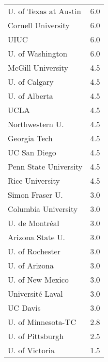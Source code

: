 \documentclass[aspectratio=169]{beamer}
\begin{document}
\begin{frame}[fragile]
\begin{columns}[T]
\begin{column}{0.5\textwidth}
\begin{tabularx}{\linewidth}{lS[table-format=1.1]}
                \midrule
                U. of Texas at Austin & 6.0 \\
                Cornell University & 6.0 \\
                UIUC & 6.0 \\
                U. of Washington & 6.0 \\
                McGill University & 4.5 \\
                U. of Calgary & 4.5 \\
                U. of Alberta & 4.5 \\
                UCLA & 4.5 \\
                Northwestern U. & 4.5 \\
                Georgia Tech & 4.5 \\
                UC San Diego & 4.5 \\
                Penn State University & 4.5 \\
                Rice University & 4.5 \\
                Simon Fraser U. & 3.0 \\
                Columbia University & 3.0 \\
                U. de Montréal & 3.0 \\
                Arizona State U. & 3.0 \\
                U. of Rochester & 3.0 \\
                U. of Arizona & 3.0 \\
                U. of New Mexico & 3.0 \\
                Université Laval & 3.0 \\
                UC Davis & 3.0 \\
                U. of Minnesota-TC & 2.8 \\
                U. of Pittsburgh & 2.5 \\
                U. of Victoria & 1.5 \\
                \bottomrule
            \end{tabularx}
        \end{column}
    \end{columns}
\end{frame}
\end{document}
